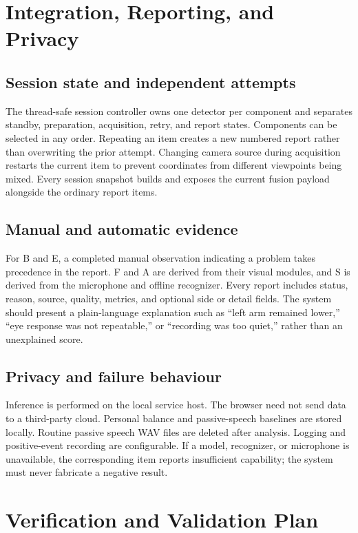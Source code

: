 \documentclass[11pt,a4paper]{article}
\begin{document}
\section{Integration, Reporting, and Privacy}

\subsection{Session state and independent attempts}

The thread-safe session controller owns one detector per component and separates standby, preparation, acquisition, retry, and report states. Components can be selected in any order. Repeating an item creates a new numbered report rather than overwriting the prior attempt. Changing camera source during acquisition restarts the current item to prevent coordinates from different viewpoints being mixed. Every session snapshot builds and exposes the current fusion payload alongside the ordinary report items.

\subsection{Manual and automatic evidence}

For B and E, a completed manual observation indicating a problem takes precedence in the report. F and A are derived from their visual modules, and S is derived from the microphone and offline recognizer. Every report includes status, reason, source, quality, metrics, and optional side or detail fields. The system should present a plain-language explanation such as ``left arm remained lower,'' ``eye response was not repeatable,'' or ``recording was too quiet,'' rather than an unexplained score.

\subsection{Privacy and failure behaviour}

Inference is performed on the local service host. The browser need not send data to a third-party cloud. Personal balance and passive-speech baselines are stored locally. Routine passive speech WAV files are deleted after analysis. Logging and positive-event recording are configurable. If a model, recognizer, or microphone is unavailable, the corresponding item reports insufficient capability; the system must never fabricate a negative result.

\section{Verification and Validation Plan}
\end{document}

